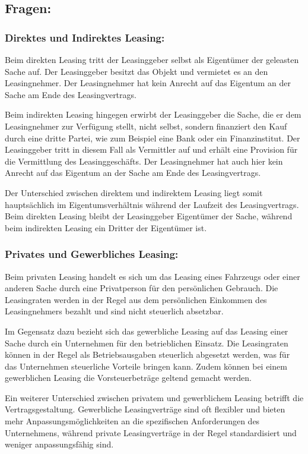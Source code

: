 \documentclass{article}
\begin{document}
\subsection*{Fragen:}
\subsubsection*{Direktes und Indirektes Leasing:}
Beim direkten Leasing tritt der Leasinggeber selbst als Eigentümer der
geleasten Sache auf. Der Leasinggeber besitzt das Objekt und vermietet es an
den Leasingnehmer. Der Leasingnehmer hat kein Anrecht auf das Eigentum an der
Sache am Ende des Leasingvertrags.

Beim indirekten Leasing hingegen erwirbt der Leasinggeber die Sache, die er dem
Leasingnehmer zur Verfügung stellt, nicht selbst, sondern finanziert den Kauf
durch eine dritte Partei, wie zum Beispiel eine Bank oder ein Finanzinstitut.
Der Leasinggeber tritt in diesem Fall als Vermittler auf und erhält eine
Provision für die Vermittlung des Leasinggeschäfts. Der Leasingnehmer hat auch
hier kein Anrecht auf das Eigentum an der Sache am Ende des Leasingvertrags.

Der Unterschied zwischen direktem und indirektem Leasing liegt somit
hauptsächlich im Eigentumsverhältnis während der Laufzeit des Leasingvertrags.
Beim direkten Leasing bleibt der Leasinggeber Eigentümer der Sache, während
beim indirekten Leasing ein Dritter der Eigentümer ist.

\subsubsection*{Privates und Gewerbliches Leasing:}
Beim privaten Leasing handelt es sich um das Leasing eines Fahrzeugs oder einer
anderen Sache durch eine Privatperson für den persönlichen Gebrauch. Die
Leasingraten werden in der Regel aus dem persönlichen Einkommen des
Leasingnehmers bezahlt und sind nicht steuerlich absetzbar.

Im Gegensatz dazu bezieht sich das gewerbliche Leasing auf das Leasing einer
Sache durch ein Unternehmen für den betrieblichen Einsatz. Die Leasingraten
können in der Regel als Betriebsausgaben steuerlich abgesetzt werden, was für
das Unternehmen steuerliche Vorteile bringen kann. Zudem können bei einem
gewerblichen Leasing die Vorsteuerbeträge geltend gemacht werden.

Ein weiterer Unterschied zwischen privatem und gewerblichem Leasing betrifft
die Vertragsgestaltung. Gewerbliche Leasingverträge sind oft flexibler und
bieten mehr Anpassungsmöglichkeiten an die spezifischen Anforderungen des
Unternehmens, während private Leasingverträge in der Regel standardisiert und
weniger anpassungsfähig sind.
\end{document}
